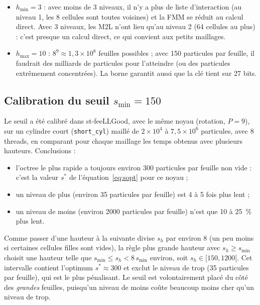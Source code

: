 \documentclass[11pt,a4paper]{article}
\newcommand{\code}[1]{\texttt{#1}}
\begin{document}
\begin{itemize}
  \item $h_{\min} = 3$ : avec moins de 3 niveaux, il n'y a plus de liste d'interaction (au niveau
        1, les 8 cellules sont toutes voisines) et la FMM se réduit au calcul direct. Avec 3
        niveaux, les M2L n'ont lieu qu'au niveau 2 (64 cellules au plus) : c'est presque un
        calcul direct, ce qui convient aux petits maillages.
  \item $h_{\max} = 10$ : $8^9 \approx 1{,}3\times 10^8$ feuilles possibles ; avec 150 particules
        par feuille, il faudrait des milliards de particules pour l'atteindre (ou des
        particules extrêmement concentrées). La borne garantit aussi que la clé tient sur
        27 bits.
\end{itemize}

\subsection{\texorpdfstring{Calibration du seuil $s_{\min} = 150$}{Calibration du seuil smin = 150}}
\label{sec:calib}

Le seuil a été calibré dans st-feeLLGood, avec le même noyau (rotation, $P = 9$), sur un cylindre
court (\code{short\_cyl}) maillé de $2\times 10^4$ à $7{,}5\times 10^6$ particules, avec
8 threads, en comparant pour chaque maillage les temps obtenus avec plusieurs hauteurs. Conclusions :
\begin{itemize}
  \item l'octree le plus rapide a toujours environ 300 particules par feuille non vide :
        c'est la valeur $s^\ast$ de l'équation~\eqref{eq:sopt} pour ce noyau ;
  \item un niveau de plus (environ 35 particules par feuille) est 4 à 5 fois plus lent ;
  \item un niveau de moins (environ 2000 particules par feuille) n'est que 10 à 25~\% plus lent.
\end{itemize}

Comme passer d'une hauteur à la suivante divise $s_h$ par environ 8 (un peu moins si certaines
cellules filles sont vides), la règle \og plus grande hauteur avec $s_h \ge s_{\min}$\fg{} choisit
une hauteur telle que $s_{\min} \le s_h < 8\, s_{\min}$ environ, soit $s_h \in [150, 1200[$.
Cet intervalle contient l'optimum $s^\ast \approx 300$ et exclut le niveau de trop (35 particules
par feuille), qui est le plus pénalisant. Le seuil est volontairement placé du côté des
\emph{grandes} feuilles, puisqu'un niveau de moins coûte beaucoup moins cher qu'un niveau de trop.
\end{document}
